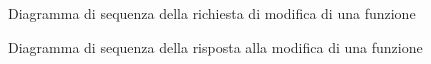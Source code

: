 \begin{figure}[H]
	\noindent
	\caption{Diagramma di sequenza della richiesta di modifica di una funzione}
\end{figure}
\begin{figure}[H]
	\noindent
	\caption{Diagramma di sequenza della risposta alla modifica di una funzione}
\end{figure}
\newpage
